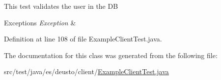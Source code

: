 This test validates the user in the DB 
\begin{DoxyExceptions}{Exceptions}
{\em Exception} & \\
\hline
\end{DoxyExceptions}


Definition at line 108 of file Example\+Client\+Test.\+java.



The documentation for this class was generated from the following file\+:\begin{DoxyCompactItemize}
\item 
src/test/java/es/deusto/client/\hyperlink{_example_client_test_8java}{Example\+Client\+Test.\+java}\end{DoxyCompactItemize}
